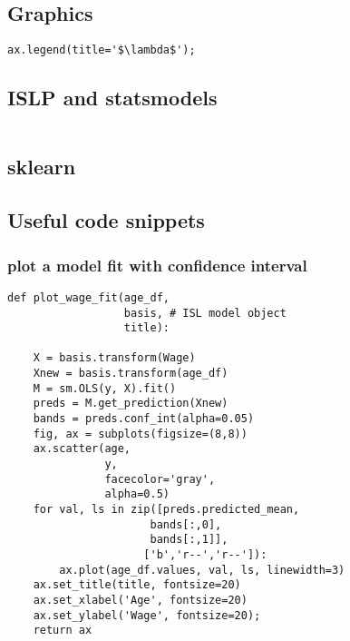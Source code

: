 \documentclass[
  letterpaper,
  DIV=11,
  numbers=noendperiod]{scrreprt}
\begin{document}
\subsection{Graphics}\label{graphics-5}

\begin{verbatim}
ax.legend(title='$\lambda$');
\end{verbatim}

\subsection{ISLP and statsmodels}\label{islp-and-statsmodels-3}

\begin{verbatim}

\end{verbatim}

\subsection{sklearn}\label{sklearn-3}

\subsection{Useful code snippets}\label{useful-code-snippets}

\subsubsection{plot a model fit with confidence
interval}\label{plot-a-model-fit-with-confidence-interval}

\begin{verbatim}
def plot_wage_fit(age_df, 
                  basis, # ISL model object
                  title):

    X = basis.transform(Wage)
    Xnew = basis.transform(age_df)
    M = sm.OLS(y, X).fit()
    preds = M.get_prediction(Xnew)
    bands = preds.conf_int(alpha=0.05)
    fig, ax = subplots(figsize=(8,8))
    ax.scatter(age,
               y,
               facecolor='gray',
               alpha=0.5)
    for val, ls in zip([preds.predicted_mean,
                      bands[:,0],
                      bands[:,1]],
                     ['b','r--','r--']):
        ax.plot(age_df.values, val, ls, linewidth=3)
    ax.set_title(title, fontsize=20)
    ax.set_xlabel('Age', fontsize=20)
    ax.set_ylabel('Wage', fontsize=20);
    return ax
\end{verbatim}
\end{document}
